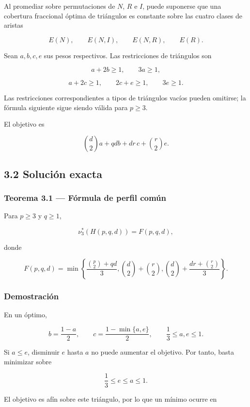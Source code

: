 \documentclass[
  spanish,
  11pt,
  a4paper,
]{article}
\begin{document}
Al promediar sobre permutaciones de \(N\), \(R\) e \(I\), puede suponerse que una cobertura fraccional óptima de triángulos es constante sobre las cuatro clases de aristas

\[
E(N),
\qquad E(N,I),
\qquad E(N,R),
\qquad E(R).
\]

Sean \(a,b,c,e\) sus pesos respectivos. Las restricciones de triángulos son

\[
a+2b\ge1,
\qquad
3a\ge1,
\tag{3.1}
\]

\[
a+2c\ge1,
\qquad
2c+e\ge1,
\qquad
3e\ge1.
\tag{3.2}
\]

Las restricciones correspondientes a tipos de triángulos vacíos pueden omitirse; la fórmula siguiente sigue siendo válida para \(p\ge3\).

El objetivo es

\[
\binom d2a+qdb+dr\,c+\binom r2e.
\tag{3.3}
\]

\subsection{3.2 Solución exacta}\label{soluciuxf3n-exacta}

\subsubsection{Teorema 3.1 --- Fórmula de perfil común}\label{teorema-3.1-fuxf3rmula-de-perfil-comuxfan}

Para \(p\ge3\) y \(q\ge1\),

\[
\boxed{
\nu_3^*(H(p,q,d))
=
F(p,q,d),
}
\tag{3.4}
\]

donde

\[
\boxed{
F(p,q,d)
=
\min\left\{
\frac{\binom p2+qd}{3},
\binom d2+\binom r2,
\binom d2+\frac{dr+\binom r2}{3}
\right\}.
}
\tag{3.5}
\]

\subsubsection{Demostración}\label{demostraciuxf3n}

En un óptimo,

\[
b=\frac{1-a}{2},
\qquad
c=\frac{1-\min\{a,e\}}2,
\qquad
\frac13\le a,e\le1.
\]

Si \(a\le e\), disminuir \(e\) hasta \(a\) no puede aumentar el objetivo. Por tanto, basta minimizar sobre

\[
\frac13\le e\le a\le1.
\]

El objetivo es afín sobre este triángulo, por lo que un mínimo ocurre en
\end{document}
